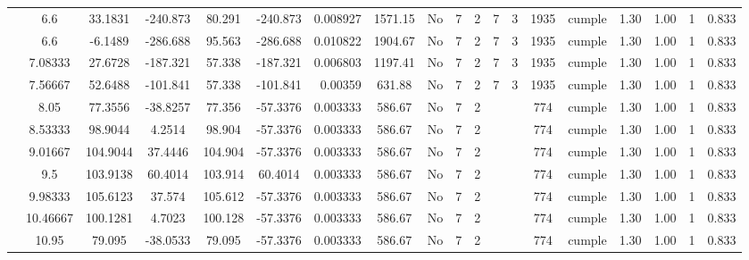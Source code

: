 \begin{table}[H]
{\begin{tabular}{|c|c|c|c|c|c|r|c|c|c|c|c|c|c|c|c|c|c|c|}
\cline{2-19}        & \cellcolor[rgb]{ .851,  .882,  .949}6.6 & 33.1831 & -240.873 & 80.291 & -240.873 & 0.008927 & 1571.15 & No  & 7   & 2   & 7   & 3   & 1935 & \cellcolor[rgb]{ .776,  .937,  .808}cumple & 1.30 & 1.00 & 1   & 0.833 \bigstrut\\
\cline{2-19}        & \cellcolor[rgb]{ .851,  .882,  .949}6.6 & -6.1489 & -286.688 & 95.563 & -286.688 & 0.010822 & 1904.67 & No  & 7   & 2   & 7   & 3   & 1935 & \cellcolor[rgb]{ .776,  .937,  .808}cumple & 1.30 & 1.00 & 1   & 0.833 \bigstrut\\
\cline{2-19}        & 7.08333 & 27.6728 & -187.321 & 57.338 & -187.321 & 0.006803 & 1197.41 & No  & 7   & 2   & 7   & 3   & 1935 & \cellcolor[rgb]{ .776,  .937,  .808}cumple & 1.30 & 1.00 & 1   & 0.833 \bigstrut\\
\cline{2-19}        & 7.56667 & 52.6488 & -101.841 & 57.338 & -101.841 & 0.00359 & 631.88 & No  & 7   & 2   & 7   & 3   & 1935 & \cellcolor[rgb]{ .776,  .937,  .808}cumple & 1.30 & 1.00 & 1   & 0.833 \bigstrut\\
\cline{2-19}        & 8.05 & 77.3556 & -38.8257 & 77.356 & -57.3376 & 0.003333 & 586.67 & No  & 7   & 2   &     &     & 774 & \cellcolor[rgb]{ .776,  .937,  .808}cumple & 1.30 & 1.00 & 1   & 0.833 \bigstrut\\
\cline{2-19}        & 8.53333 & 98.9044 & 4.2514 & 98.904 & -57.3376 & 0.003333 & 586.67 & No  & 7   & 2   &     &     & 774 & \cellcolor[rgb]{ .776,  .937,  .808}cumple & 1.30 & 1.00 & 1   & 0.833 \bigstrut\\
\cline{2-19}        & 9.01667 & 104.9044 & 37.4446 & 104.904 & -57.3376 & 0.003333 & 586.67 & No  & 7   & 2   &     &     & 774 & \cellcolor[rgb]{ .776,  .937,  .808}cumple & 1.30 & 1.00 & 1   & 0.833 \bigstrut\\
\cline{2-19}        & 9.5 & 103.9138 & 60.4014 & 103.914 & 60.4014 & 0.003333 & 586.67 & No  & 7   & 2   &     &     & 774 & \cellcolor[rgb]{ .776,  .937,  .808}cumple & 1.30 & 1.00 & 1   & 0.833 \bigstrut\\
\cline{2-19}        & 9.98333 & 105.6123 & 37.574 & 105.612 & -57.3376 & 0.003333 & 586.67 & No  & 7   & 2   &     &     & 774 & \cellcolor[rgb]{ .776,  .937,  .808}cumple & 1.30 & 1.00 & 1   & 0.833 \bigstrut\\
\cline{2-19}        & 10.46667 & 100.1281 & 4.7023 & 100.128 & -57.3376 & 0.003333 & 586.67 & No  & 7   & 2   &     &     & 774 & \cellcolor[rgb]{ .776,  .937,  .808}cumple & 1.30 & 1.00 & 1   & 0.833 \bigstrut\\
\cline{2-19}        & 10.95 & 79.095 & -38.0533 & 79.095 & -57.3376 & 0.003333 & 586.67 & No  & 7   & 2   &     &     & 774 & \cellcolor[rgb]{ .776,  .937,  .808}cumple & 1.30 & 1.00 & 1   & 0.833 \bigstrut\\

\end{tabular}}
\end{table}
